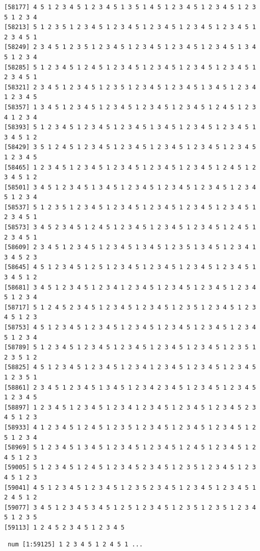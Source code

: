 \documentclass[
  11pt,
]{book}
\newenvironment{Shaded}{\begin{snugshade}}{\end{snugshade}}
\newcommand{\FunctionTok}[1]{\textcolor[rgb]{0.00,0.00,0.00}{#1}}
\newcommand{\NormalTok}[1]{#1}
\newcommand{\SpecialCharTok}[1]{\textcolor[rgb]{0.00,0.00,0.00}{#1}}
\begin{document}
\begin{verbatim}
[58177] 4 5 1 2 3 4 5 1 2 3 4 5 1 3 5 1 4 5 1 2 3 4 5 1 2 3 4 5 1 2 3 5 1 2 3 4
[58213] 5 1 2 3 5 1 2 3 4 5 1 2 3 4 5 1 2 3 4 5 1 2 3 4 5 1 2 3 4 5 1 2 3 4 5 1
[58249] 2 3 4 5 1 2 3 5 1 2 3 4 5 1 2 3 4 5 1 2 3 4 5 1 2 3 4 5 1 3 4 5 1 2 3 4
[58285] 5 1 2 3 4 5 1 2 4 5 1 2 3 4 5 1 2 3 4 5 1 2 3 4 5 1 2 3 4 5 1 2 3 4 5 1
[58321] 2 3 4 5 1 2 3 4 5 1 2 3 5 1 2 3 4 5 1 2 3 4 5 1 3 4 5 1 2 3 4 1 2 3 4 5
[58357] 1 3 4 5 1 2 3 4 5 1 2 3 4 5 1 2 3 4 5 1 2 3 4 5 1 2 4 5 1 2 3 4 1 2 3 4
[58393] 5 1 2 3 4 5 1 2 3 4 5 1 2 3 4 5 1 3 4 5 1 2 3 4 5 1 2 3 4 5 1 3 4 5 1 2
[58429] 3 5 1 2 4 5 1 2 3 4 5 1 2 3 4 5 1 2 3 4 5 1 2 3 4 5 1 2 3 4 5 1 2 3 4 5
[58465] 1 2 3 4 5 1 2 3 4 5 1 2 3 4 5 1 2 3 4 5 1 2 3 4 5 1 2 4 5 1 2 3 4 5 1 2
[58501] 3 4 5 1 2 3 4 5 1 3 4 5 1 2 3 4 5 1 2 3 4 5 1 2 3 4 5 1 2 3 4 5 1 2 3 4
[58537] 5 1 2 3 5 1 2 3 4 5 1 2 3 4 5 1 2 3 4 5 1 2 3 4 5 1 2 3 4 5 1 2 3 4 5 1
[58573] 3 4 5 2 3 4 5 1 2 4 5 1 2 3 4 5 1 2 3 4 5 1 2 3 4 5 1 2 4 5 1 2 3 4 5 1
[58609] 2 3 4 5 1 2 3 4 5 1 2 3 4 5 1 3 4 5 1 2 3 5 1 3 4 5 1 2 3 4 1 3 4 5 2 3
[58645] 4 5 1 2 3 4 5 1 2 5 1 2 3 4 5 1 2 3 4 5 1 2 3 4 5 1 2 3 4 5 1 3 4 5 1 2
[58681] 3 4 5 1 2 3 4 5 1 2 3 4 1 2 3 4 5 1 2 3 4 5 1 2 3 4 5 1 2 3 4 5 1 2 3 4
[58717] 5 1 2 4 5 2 3 4 5 1 2 3 4 5 1 2 3 4 5 1 2 3 5 1 2 3 4 5 1 2 3 4 5 1 2 3
[58753] 4 5 1 2 3 4 5 1 2 3 4 5 1 2 3 4 5 1 2 3 4 5 1 2 3 4 5 1 2 3 4 5 1 2 3 4
[58789] 5 1 2 3 4 5 1 2 3 4 5 1 2 3 4 5 1 2 3 4 5 1 2 3 4 5 1 2 3 5 1 2 3 5 1 2
[58825] 4 5 1 2 3 4 5 1 2 3 4 5 1 2 3 4 1 2 3 4 5 1 2 3 4 5 1 2 3 4 5 1 2 3 5 1
[58861] 2 3 4 5 1 2 3 4 5 1 3 4 5 1 2 3 4 2 3 4 5 1 2 3 4 5 1 2 3 4 5 1 2 3 4 5
[58897] 1 2 3 4 5 1 2 3 4 5 1 2 3 4 1 2 3 4 5 1 2 3 4 5 1 2 3 4 5 2 3 4 5 1 2 3
[58933] 4 1 2 3 4 5 1 2 4 5 1 2 3 5 1 2 3 4 5 1 2 3 4 5 1 2 3 4 5 1 2 5 1 2 3 4
[58969] 5 1 2 3 4 5 1 3 4 5 1 2 3 4 5 1 2 3 4 5 1 2 4 5 1 2 3 4 5 1 2 4 5 1 2 3
[59005] 5 1 2 3 4 5 1 2 4 5 1 2 3 4 5 2 3 4 5 1 2 3 5 1 2 3 4 5 1 2 3 4 5 1 2 3
[59041] 4 5 1 2 3 4 5 1 2 3 4 5 1 2 3 5 2 3 4 5 1 2 3 4 5 1 2 3 4 5 1 2 4 5 1 2
[59077] 3 4 5 1 2 3 4 5 3 4 5 1 2 5 1 2 3 4 5 1 2 3 5 1 2 3 5 1 2 3 4 5 1 2 3 5
[59113] 1 2 4 5 2 3 4 5 1 2 3 4 5
\end{verbatim}

\begin{Shaded}
\end{Shaded}

\begin{verbatim}
 num [1:59125] 1 2 3 4 5 1 2 4 5 1 ...
\end{verbatim}
\end{document}
